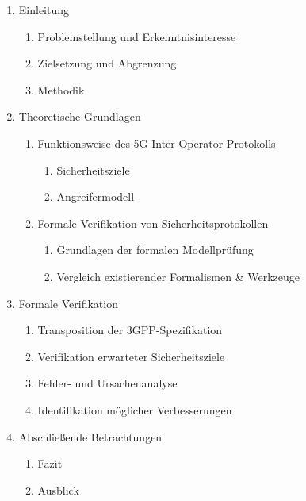 \begin{enumerate}[label=\arabic*]
    \item Einleitung
    \begin{enumerate}[label=1.\arabic*]
        \item Problemstellung und Erkenntnisinteresse
        \item Zielsetzung und Abgrenzung
        \item Methodik
    \end{enumerate}
    \item Theoretische Grundlagen
    \begin{enumerate}[label=2.\arabic*]
        \item Funktionsweise des 5G Inter-Operator-Protokolls
        \begin{enumerate}[label=2.1.\arabic*]
            \item Sicherheitsziele
            \item Angreifermodell
        \end{enumerate}
        \item Formale Verifikation von Sicherheitsprotokollen
        \begin{enumerate}[label=2.2.\arabic*]
            \item Grundlagen der formalen Modellprüfung
            \item Vergleich existierender Formalismen \& Werkzeuge 
        \end{enumerate}
    \end{enumerate}
    \item Formale Verifikation
    \begin{enumerate}[label=3.\arabic*]
        \item Transposition der 3GPP-Spezifikation
        \item Verifikation erwarteter Sicherheitsziele
        \item Fehler- und Ursachenanalyse
        \item Identifikation möglicher Verbesserungen
    \end{enumerate}
    \item Abschließende Betrachtungen
    \begin{enumerate}[label=4.\arabic*]
        \item Fazit
        \item Ausblick
    \end{enumerate}
\end{enumerate}